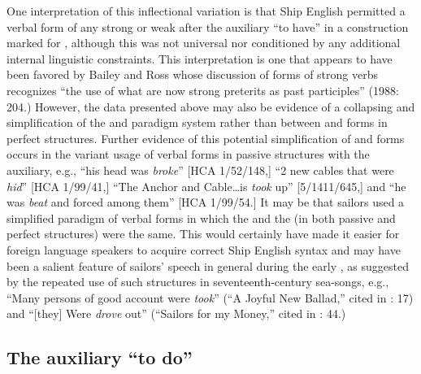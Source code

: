 One interpretation of this inflectional variation is that Ship English permitted a  verbal form of any strong or weak  after the auxiliary “to have” in a construction marked for , although this was not universal nor conditioned by any additional internal linguistic constraints. This interpretation is one that appears to have been favored by Bailey and Ross whose discussion of  forms of strong verbs recognizes “the use of what are now strong preterits as past participles” (1988: 204.) However, the data presented above may also be evidence of a collapsing and simplification of the  and  paradigm system rather than  between  and  forms in perfect structures. Further evidence of this potential simplification of  and  forms occurs in the variant usage of verbal forms in passive structures with the  auxiliary, e.g., “his head was \textit{broke}” [HCA 1/52/148,] “2 new cables that were \textit{hid}” [HCA 1/99/41,] “The Anchor and Cable…is \textit{took} up” [5/1411/645,] and “he was \textit{beat} and forced among them” [HCA 1/99/54.] It may be that sailors used a simplified paradigm of verbal forms in which the  and the  (in both passive and perfect structures) were the same. This would certainly have made it easier for foreign language speakers to acquire correct Ship English syntax and may have been a salient feature of sailors’ speech in general during the early , as suggested by the repeated use of such structures in seventeenth-century sea-songs, e.g., “Many persons of good account were \textit{took}” (“A Joyful New Ballad,” cited in \citealt{Palmer1986}: 17) and “[they] Were \textit{drove} out” (“Sailors for my Money,” cited in \citealt{Palmer1986}: 44.) 

\subsection{{The} {auxiliary} {“to} {do”}}%

